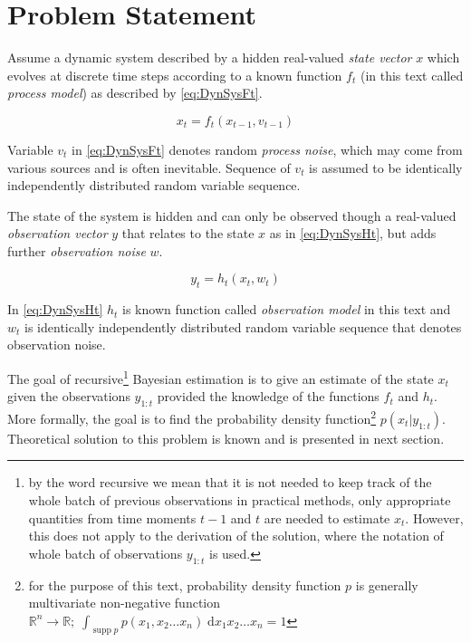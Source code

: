 \documentclass[a4paper,12pt,oneside]{report}
\newcommand{\pdf}{probability density function}
\newcommand{\supp}{\operatorname{supp}}
\begin{document}
\section{Problem Statement}

Assume a dynamic system described by a hidden real-valued \emph{state vector} \(x\) which evolves at
discrete time steps according to a known function \(f_t\) (in this text called \emph{process model})
as described by \eqref{eq:DynSysFt}.

\begin{equation} \label{eq:DynSysFt}
	x_t = f_t(x_{t-1}, v_{t-1})
\end{equation}

Variable \(v_t\) in \eqref{eq:DynSysFt} denotes random \emph{process noise}, which may come from various
sources and is often inevitable. Sequence of \(v_t\) is assumed to be identically independently
distributed random variable sequence.

The state of the system is hidden and can only be observed though a real-valued \emph{observation vector}
\(y\) that relates to the state \(x\) as in \eqref{eq:DynSysHt}, but adds further \emph{observation
noise} \(w\).

\begin{equation} \label{eq:DynSysHt}
	y_t = h_t(x_t, w_t)
\end{equation}

In \eqref{eq:DynSysHt} \(h_t\) is known function called \emph{observation model} in this text and \(w_t\) is
identically independently distributed random variable sequence that denotes observation noise.

The goal of recursive\footnote{by the word recursive we mean that it is not needed to keep track of
the whole batch of previous observations in practical methods, only appropriate quantities from time
moments \(t-1\) and \(t\) are needed to estimate \(x_t\). However, this does not apply to the
derivation of the solution, where the notation of whole batch of observations \(y_{1:t}\) is used.}
Bayesian estimation is to give an estimate of the state \(x_t\) given the
observations \(y_{1:t}\) provided the knowledge of the functions \(f_t\) and \(h_t\).
More formally, the goal is to find the probability density function\footnote{for the purpose of this %
text, {\pdf} \(p\) is generally multivariate non-negative function \(\mathbb{R}^n \rightarrow
\mathbb{R}; \; \int_{\supp p} p(x_1, x_2 \dots x_n)  \; \mathrm{d} x_1 x_2 \dots x_n = 1\)}
\(p(x_t | y_{1:t})\).
Theoretical solution to this problem is known and is presented in next section.
\end{document}
